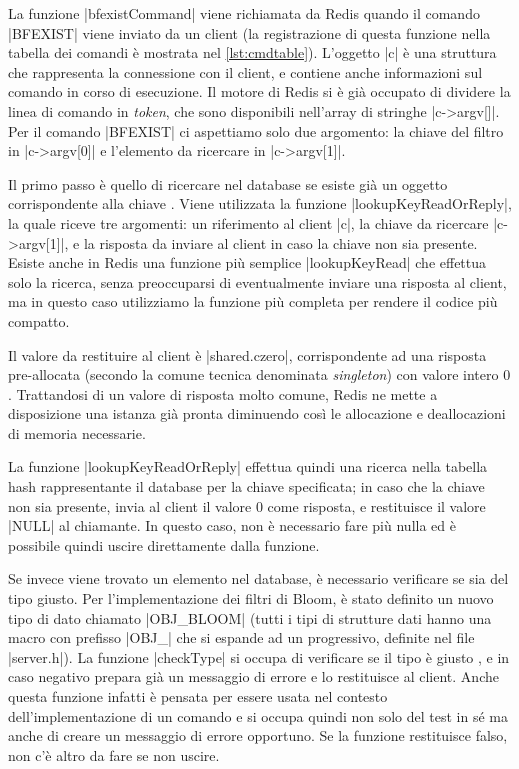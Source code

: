 La funzione \cverb|bfexistCommand| viene richiamata da Redis quando il comando \cverb|BFEXIST| viene
inviato da un client (la registrazione di questa funzione nella tabella dei comandi è mostrata nel
\autoref{lst:cmdtable}). L'oggetto \cverb|c| è una struttura che rappresenta la connessione con il
client, e contiene anche informazioni sul comando in corso di esecuzione. Il motore di Redis si è
già occupato di dividere la linea di comando in \emph{token}, che sono disponibili nell'array di
stringhe \cverb|c->argv[]|. Per il comando \cverb|BFEXIST| ci aspettiamo solo due argomento: la chiave
del filtro in \cverb|c->argv[0]| e l'elemento da ricercare in \cverb|c->argv[1]|.

Il primo passo è quello di ricercare nel database se esiste già un oggetto corrispondente alla
chiave . Viene utilizzata la funzione \cverb|lookupKeyReadOrReply|, la quale riceve
tre argomenti: un riferimento al client \cverb|c|, la chiave da ricercare \cverb|c->argv[1]|, e 
la risposta da inviare al client in caso la chiave non sia presente. Esiste anche in Redis una
funzione più semplice \cverb|lookupKeyRead| che effettua solo la ricerca, senza preoccuparsi
di eventualmente inviare una risposta al client, ma in questo caso utilizziamo la funzione
più completa per rendere il codice più compatto.

Il valore da restituire al client è \cverb|shared.czero|, corrispondente ad una risposta pre-allocata
(secondo la comune tecnica denominata \emph{singleton}) con valore intero $0$. Trattandosi di un
valore di risposta molto comune, Redis ne mette a disposizione una istanza già pronta diminuendo
così le allocazione e deallocazioni di memoria necessarie.

La funzione \cverb|lookupKeyReadOrReply| effettua quindi una ricerca nella tabella hash
rappresentante il database per la chiave specificata; in caso che la chiave non sia presente, invia
al client il valore $0$ come risposta, e restituisce il valore \cverb|NULL| al chiamante. In questo
caso, non è necessario fare più nulla ed è possibile quindi uscire direttamente dalla funzione.

Se invece viene trovato un elemento nel database, è necessario verificare se sia del tipo giusto.
Per l'implementazione dei filtri di Bloom, è stato definito un nuovo tipo di dato chiamato 
\cverb|OBJ_BLOOM| (tutti i tipi di strutture dati hanno una macro con prefisso \cverb|OBJ_| che
si espande ad un progressivo, definite nel file \cverb|server.h|). La funzione \cverb|checkType| si
occupa di verificare se il tipo è giusto , e in caso negativo prepara già un messaggio di
errore e lo restituisce al client. Anche questa funzione infatti è pensata per essere usata nel
contesto dell'implementazione di un comando e si occupa quindi non solo del test in sé ma anche di
creare un messaggio di errore opportuno. Se la funzione restituisce falso, non c'è altro da fare se
non uscire.

